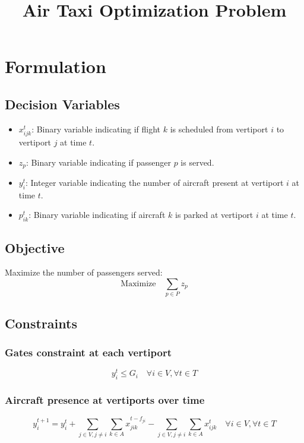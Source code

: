 \documentclass{article}
\title{Air Taxi Optimization Problem}
\author{}
\date{}
\begin{document}
\maketitle

\section{Formulation}

\subsection{Decision Variables}
\begin{itemize}
    \item $x_{ijk}^t$: Binary variable indicating if flight $k$ is scheduled from vertiport $i$ to vertiport $j$ at time $t$.
    \item $z_p$: Binary variable indicating if passenger $p$ is served.
    \item $y_i^t$: Integer variable indicating the number of aircraft present at vertiport $i$ at time $t$.
    \item $p_{ik}^t$: Binary variable indicating if aircraft $k$ is parked at vertiport $i$ at time $t$.
\end{itemize}

\subsection{Objective}
Maximize the number of passengers served:
\[
\text{Maximize} \quad \sum_{p \in P} z_p
\]

\subsection{Constraints}

\subsubsection{Gates constraint at each vertiport}
\[
y_i^t \leq G_i \quad \forall i \in V, \forall t \in T
\]

\subsubsection{Aircraft presence at vertiports over time}
\[
y_i^{t+1} = y_i^t + \sum_{j \in V, j \neq i} \sum_{k \in A} x_{jik}^{t-f_{ji}} - \sum_{j \in V, j \neq i} \sum_{k \in A} x_{ijk}^t \quad \forall i \in V, \forall t \in T
\]
\end{document}
